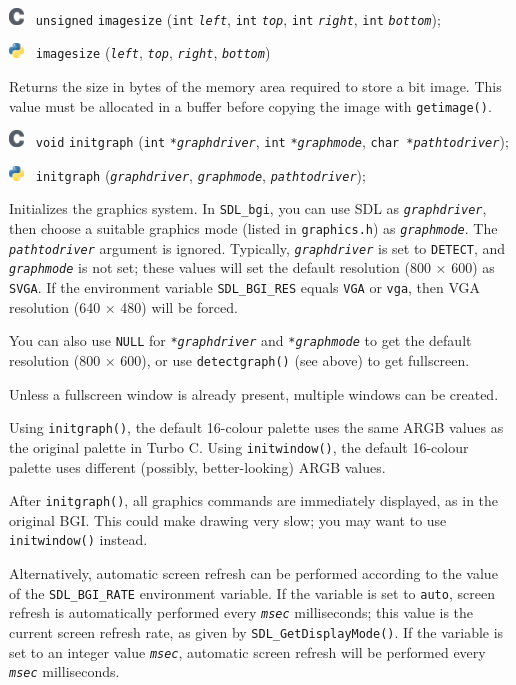\documentclass[a4paper,12pt]{article}
\newcommand{\ntt}[1]{\texttt{#1}}
\newcommand{\V}{\ntt{void}}          %
\newcommand{\I}{\ntt{int}}           %
\newcommand{\C}{\ntt{char *}}        %
\newcommand{\fn}[1]{\ntt{#1}}        %
\newcommand{\p}[1]{\emph{\ntt{#1}}}  %
\newcommand{\F}[1]{\ntt{#1}}         %
\newcommand{\T}[1]{\ntt{#1}}         %
\newcommand{\SDLbgi}{\texttt{SDL\_bgi}}
\newcommand{\Clogo}{\raisebox{-.25\height}%
{\includegraphics[width=0.4cm]{C.png}~}}
\newcommand{\Plogo}{\raisebox{-.25\height}%
{\includegraphics[width=0.4cm]{Python.png}~}}
\newenvironment{bgi}
{ %
  \begin{snugshade}
}
{ %
  \end{snugshade}
}
\begin{document}
\begin{bgi}
\Clogo{} \T{unsigned} \fn{imagesize} (\I{} \p{left}, \I{} \p{top},
\I{} \p{right}, \I{} \p{bottom});

\Plogo{} \fn{imagesize} (\p{left}, \p{top}, \p{right}, \p{bottom})
\end{bgi}

Returns the size in bytes of the memory area required to store a bit
image. This value must be allocated in a buffer before copying the
image with \fn{getimage()}.


\addcontentsline{toc}{subsection}{\T{initgraph()}}
\label{sec:initgraph}

\begin{bgi}
\Clogo{} \V{} \fn{initgraph} (\I{} \p{*graphdriver}, \I{}
\p{*graphmode}, \C{}\p{path\-to\-dri\-ver});

\Plogo{} \fn{initgraph} (\p{graphdriver}, \p{graphmode},
\p{pathtodriver});
\end{bgi}

Initializes the graphics system. In \SDLbgi, you can use SDL as
\p{graphdriver}, then choose a suitable graphics mode (listed in
\F{graphics.h}) as \p{graphmode}. The \p{pathto\-dri\-ver} argument is
ignored. Typically, \p{graphdriver} is set to \T{DETECT}, and
\p{graphmode} is not set; these values will set the default resolution
(800 $\times$ 600) as \T{SVGA}. If the environment variable
\T{SDL\_BGI\_RES} equals \T{VGA} or \T{vga}, then VGA resolution (640
$\times$ 480) will be forced.

You can also use \T{NULL} for \p{*graphdriver} and \p{*graphmode} to
get the default resolution (800 $\times$ 600), or use
\fn{detectgraph()} (see above) to get fullscreen.

Unless a fullscreen window is already present, multiple windows can be
created.

Using \fn{initgraph()}, the default 16-colour palette uses the same
ARGB values as the original palette in Turbo C. Using
\fn{initwindow()}, the default 16-colour palette uses different
(possibly, better-looking) ARGB values.

After \fn{initgraph()}, all graphics commands are immediately
displayed, as in the original BGI. This could make drawing very slow;
you may want to use \fn{initwindow()} instead.

Alternatively, automatic screen refresh can be performed according to
the value of the \T{SDL\_BGI\_RATE} environment variable. If the
variable is set to \T{auto}, screen refresh is automatically performed
every \p{msec} milliseconds; this value is the current screen refresh
rate, as given by \T{SDL\_GetDisplayMode()}. If the variable is set to
an integer value \p{msec}, automatic screen refresh will be performed
every \p{msec} milliseconds.
\end{document}
